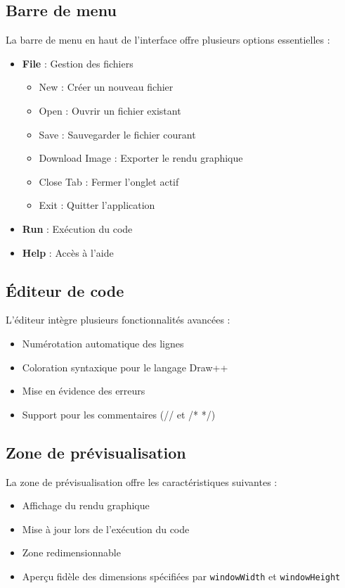 \documentclass[12pt,a4paper]{report}
\begin{document}
\subsection{Barre de menu}
La barre de menu en haut de l'interface offre plusieurs options essentielles :
\begin{itemize}
    \item \textbf{File} : Gestion des fichiers
    \begin{itemize}
        \item New : Créer un nouveau fichier
        \item Open : Ouvrir un fichier existant
        \item Save : Sauvegarder le fichier courant
        \item Download Image : Exporter le rendu graphique
        \item Close Tab : Fermer l'onglet actif
        \item Exit : Quitter l'application
    \end{itemize}
    \item \textbf{Run} : Exécution du code
    \item \textbf{Help} : Accès à l'aide
\end{itemize}

\subsection{Éditeur de code}
L'éditeur intègre plusieurs fonctionnalités avancées :
\begin{itemize}
    \item Numérotation automatique des lignes
    \item Coloration syntaxique pour le langage Draw++
    \item Mise en évidence des erreurs
    \item Support pour les commentaires (// et /* */)
\end{itemize}

\subsection{Zone de prévisualisation}
La zone de prévisualisation offre les caractéristiques suivantes :
\begin{itemize}
    \item Affichage du rendu graphique
    \item Mise à jour lors de l'exécution du code
    \item Zone redimensionnable
    \item Aperçu fidèle des dimensions spécifiées par \texttt{windowWidth} et \texttt{windowHeight}
\end{itemize}
\newpage
\end{document}
